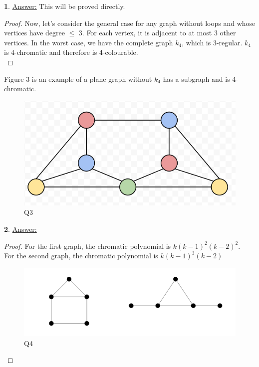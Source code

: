 \documentclass[12pt,a4paper]{article}
\theoremstyle{definition}
\newtheorem{problem}{}
\begin{document}
\begin{problem} \underline{Answer:} This will be proved directly. \\
\begin{proof} 
Now, let's consider the general case for any graph without loops and whose vertices have degree $\leq$ 3. For each vertex, it is adjacent to at most 3 other vertices. In the worst case, we have the complete graph $k_4$, which is 3-regular. $k_4$ is 4-chromatic and therefore is 4-colourable. \\
\end{proof}

Figure 3 is an example of a plane graph without $k_4$ has a subgraph and is 4-chromatic. 
\begin{figure}[H]
    \centering
    \includegraphics[scale=0.6]{q3.png}
    \caption{Q3}
    \label{fig:my_label}
\end{figure}
\end{problem}

\begin{problem} \underline{Answer:} \\
\begin{proof}
For the first graph, the chromatic polynomial is $k(k - 1)^2(k - 2)^2$. \\

For the second graph, the chromatic polynomial is $k(k - 1)^3(k - 2)$
\begin{figure}[H]
    \centering
    \includegraphics[scale=0.6]{q4.png}
    \caption{Q4}
    \label{fig:my_label}
\end{figure}
\end{proof}
\end{problem}
\end{document}
